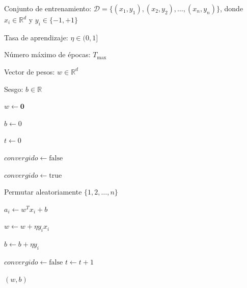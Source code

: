 \documentclass{article}
\begin{document}
\begin{algorithm}[H]
\caption{Algoritmo de Aprendizaje del Perceptrón Estocástico}
\label{alg:perceptron}

\begin{algorithmic}[1]
\Statex Conjunto de entrenamiento:
$\mathcal{D}=\{(x_1,y_1),(x_2,y_2),\ldots,(x_n,y_n)\}$,
donde $x_i\in\mathbb{R}^{d}$ y
$y_i\in\{-1,+1\}$

\Statex Tasa de aprendizaje:
$\eta\in(0,1]$

\Statex Número máximo de épocas:
$T_{\max}$

\Ensure
\Statex Vector de pesos:
$w\in\mathbb{R}^{d}$

\Statex Sesgo:
$b\in\mathbb{R}$

\State $w \gets \mathbf{0}$

\State $b \gets 0$

\State $t \gets 0$

\State $\mathit{convergido} \gets \mathrm{false}$


    \State $\mathit{convergido} \gets \mathrm{true}$

    \State Permutar aleatoriamente
    $\{1,2,\ldots,n\}$


        \State
        $a_i \gets w^{T}x_i+b$


            \State
            $w \gets w+\eta y_i x_i$

            \State
            $b \gets b+\eta y_i$

            \State
            $\mathit{convergido} \gets \mathrm{false}$
        \EndIf
    \EndFor
    \State
    $t \gets t+1$

\EndWhile

\State \Return $(w,b)$

\end{algorithmic}
\end{algorithm}
\end{document}
